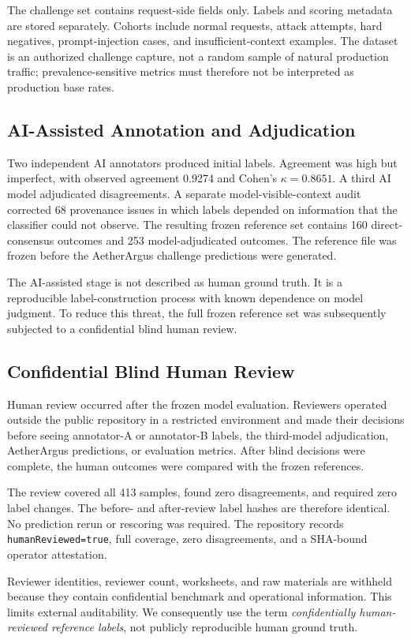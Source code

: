 The challenge set contains request-side fields only. Labels and scoring metadata are stored separately. Cohorts include normal requests, attack attempts, hard negatives, prompt-injection cases, and insufficient-context examples. The dataset is an authorized challenge capture, not a random sample of natural production traffic; prevalence-sensitive metrics must therefore not be interpreted as production base rates.

\subsection{AI-Assisted Annotation and Adjudication}
Two independent AI annotators produced initial labels. Agreement was high but imperfect, with observed agreement 0.9274 and Cohen's $\kappa=0.8651$. A third AI model adjudicated disagreements. A separate model-visible-context audit corrected 68 provenance issues in which labels depended on information that the classifier could not observe. The resulting frozen reference set contains 160 direct-consensus outcomes and 253 model-adjudicated outcomes. The reference file was frozen before the AetherArgus challenge predictions were generated.

The AI-assisted stage is not described as human ground truth. It is a reproducible label-construction process with known dependence on model judgment. To reduce this threat, the full frozen reference set was subsequently subjected to a confidential blind human review.

\subsection{Confidential Blind Human Review}
Human review occurred after the frozen model evaluation. Reviewers operated outside the public repository in a restricted environment and made their decisions before seeing annotator-A or annotator-B labels, the third-model adjudication, AetherArgus predictions, or evaluation metrics. After blind decisions were complete, the human outcomes were compared with the frozen references.

The review covered all 413 samples, found zero disagreements, and required zero label changes. The before- and after-review label hashes are therefore identical. No prediction rerun or rescoring was required. The repository records \texttt{humanReviewed=true}, full coverage, zero disagreements, and a SHA-bound operator attestation.

Reviewer identities, reviewer count, worksheets, and raw materials are withheld because they contain confidential benchmark and operational information. This limits external auditability. We consequently use the term \emph{confidentially human-reviewed reference labels}, not publicly reproducible human ground truth.

